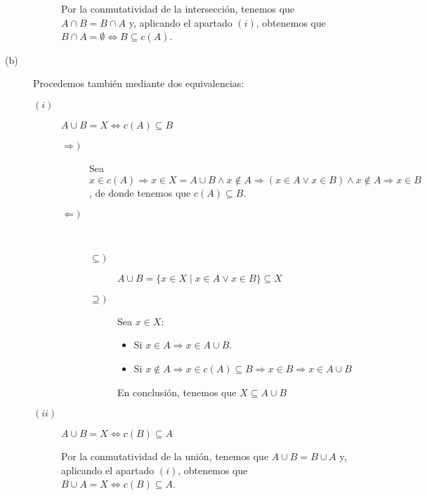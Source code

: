 \begin{ejercicio}
\begin{description}
\begin{description}
                    Por la conmutatividad de la intersección, tenemos que $A\cap B = B\cap A$ y, aplicando el apartado $(i)$, obtenemos que $B\cap A=\emptyset \Longleftrightarrow B\subseteq c(A)$.
            \end{description}
        \item [(b)] Procedemos también mediante dos equivalencias:
            \begin{description}
                \item [$(i)$] $A\cup B=X \Longleftrightarrow c(A)\subseteq B$
                    \begin{description}
                        \item [$\Longrightarrow)$] Sea $x\in c(A) \Longrightarrow x\in X=A\cup B\land x\notin A \Longrightarrow (x\in A\lor x\in B)\land x\notin A \Longrightarrow x\in B$, de donde tenemos que $c(A)\subseteq B$.
                        \item [$\Longleftarrow)$] \ 
                            \begin{description}
                                \item [$\subseteq)$] $A\cup B = \{x\in X\mid x\in A\lor x\in B\} \subseteq X$
                                \item [$\supseteq)$] Sea $x\in X$:
                                    \begin{itemize}
                                        \item Si $x\in A \Longrightarrow x\in A\cup B$.
                                        \item Si $x\notin A\Longrightarrow x\in c(A)\subseteq B\Longrightarrow x\in B\Longrightarrow x\in A\cup B$
                                    \end{itemize}
                                    En conclusión, tenemos que $X\subseteq A\cup B$
                            \end{description}
                    \end{description}
                \item [$(ii)$] $A\cup B=X \Longleftrightarrow c(B) \subseteq A$

                    Por la conmutatividad de la unión, tenemos que $A\cup B = B\cup A$ y, aplicando el apartado $(i)$, obtenemos que $B\cup A=X \Longleftrightarrow c(B)\subseteq A$.
            \end{description}
    \end{description}
\end{ejercicio}

